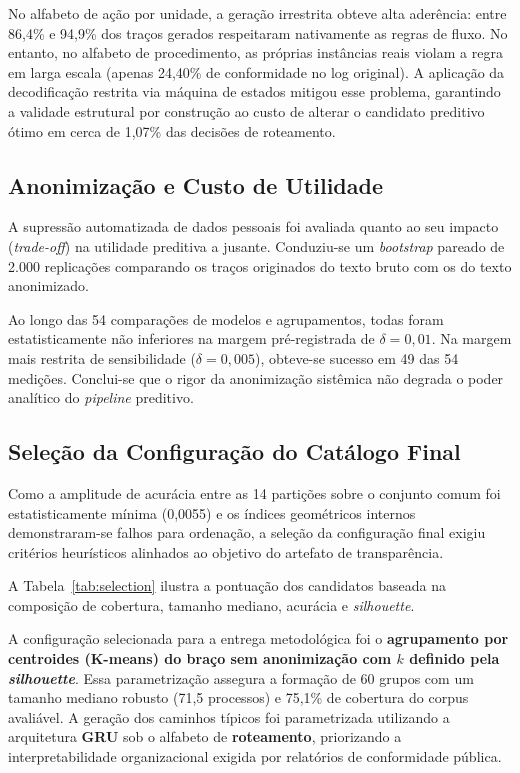 

No alfabeto de ação por unidade, a geração irrestrita obteve alta aderência: entre 86,4\% e 94,9\% dos traços gerados respeitaram nativamente as regras de fluxo. No entanto, no alfabeto de procedimento, as próprias instâncias reais violam a regra em larga escala (apenas 24,40\% de conformidade no log original). A aplicação da decodificação restrita via máquina de estados mitigou esse problema, garantindo a validade estrutural por construção ao custo de alterar o candidato preditivo ótimo em cerca de 1,07\% das decisões de roteamento.

\subsection{Anonimização e Custo de Utilidade}\label{sec:res-anon}

A supressão automatizada de dados pessoais foi avaliada quanto ao seu impacto (\emph{trade-off}) na utilidade preditiva a jusante. Conduziu-se um \emph{bootstrap} pareado de 2.000 replicações comparando os traços originados do texto bruto com os do texto anonimizado. 

Ao longo das 54 comparações de modelos e agrupamentos, todas foram estatisticamente não inferiores na margem pré-registrada de $\delta = 0{,}01$. Na margem mais restrita de sensibilidade ($\delta = 0{,}005$), obteve-se sucesso em 49 das 54 medições. Conclui-se que o rigor da anonimização sistêmica não degrada o poder analítico do \emph{pipeline} preditivo.

\subsection{Seleção da Configuração do Catálogo Final}\label{sec:selecao}

Como a amplitude de acurácia entre as 14 partições sobre o conjunto comum foi estatisticamente mínima (0,0055) e os índices geométricos internos demonstraram-se falhos para ordenação, a seleção da configuração final exigiu critérios heurísticos alinhados ao objetivo do artefato de transparência.

A Tabela~\ref{tab:selection} ilustra a pontuação dos candidatos baseada na composição de cobertura, tamanho mediano, acurácia e \emph{silhouette}.



A configuração selecionada para a entrega metodológica foi o \textbf{agrupamento por centroides (K-means) do braço sem anonimização com $k$ definido pela \emph{silhouette}}. Essa parametrização assegura a formação de 60 grupos com um tamanho mediano robusto (71,5 processos) e 75,1\% de cobertura do corpus avaliável. A geração dos caminhos típicos foi parametrizada utilizando a arquitetura \textbf{GRU} sob o alfabeto de \textbf{roteamento}, priorizando a interpretabilidade organizacional exigida por relatórios de conformidade pública.


